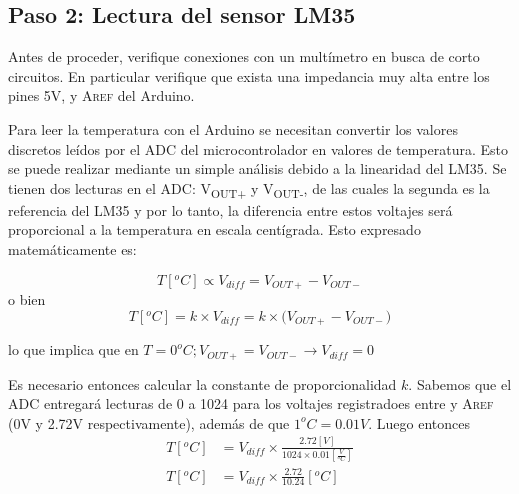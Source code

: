 %
%



\subsection{Paso 2: Lectura del sensor LM35}%
\label{sec:step2}
Antes de proceder, verifique conexiones con un multímetro en busca de corto circuitos.
En particular verifique que exista una impedancia muy alta entre los pines 5V, \GND y \textsc{Aref} del Arduino.

Para leer la temperatura con el Arduino se necesitan convertir los valores discretos leídos por el ADC del microcontrolador en valores de temperatura.
Esto se puede realizar mediante un simple análisis debido a la linearidad del LM35.
Se tienen dos lecturas en el ADC: V\textsubscript{OUT+} y V\textsubscript{OUT-}, de las cuales la segunda es la referencia del LM35 y por lo tanto, la diferencia entre estos voltajes será proporcional a la temperatura en escala centígrada.
Esto expresado matemáticamente es:

\begin{equation*}
	T[^{o}C] \propto V_{diff} = V_{OUT+}-V_{OUT-}
\end{equation*}
\noindent o bien
\begin{equation*}
	T[^{o}C] = k \times V_{diff} = k \times \big( V_{OUT+}-V_{OUT-} \big)
\end{equation*}

\noindent lo que implica que en $T = 0^{o}C; V_{OUT+}=V_{OUT-} \rightarrow V_{diff} = 0$

\medskip
Es necesario entonces calcular la constante de proporcionalidad $k$.
Sabemos que el ADC entregará lecturas de 0 a 1024 para los voltajes registradoes entre \GND y \textsc{Aref} (0V y 2.72V respectivamente), además de que $1^{o}C = 0.01V$.
Luego entonces
\begin{align*}
	T[^{o}C] &= V_{diff} \times \frac{2.72[V]}{ 1024 \times 0.01[\tfrac{V}{^{o}C}] }  \\
	T[^{o}C] &= V_{diff} \times \frac{2.72}{ 10.24 }[^{o}C]  \\
\end{align*}

